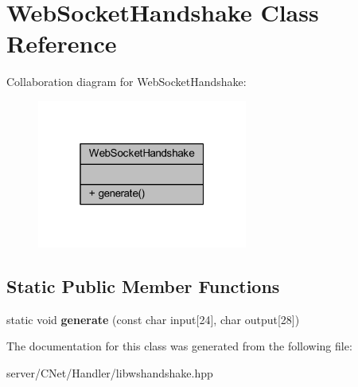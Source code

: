 \hypertarget{class_web_socket_handshake}{}\section{Web\+Socket\+Handshake Class Reference}
\label{class_web_socket_handshake}


Collaboration diagram for Web\+Socket\+Handshake\+:
\nopagebreak
\begin{figure}[H]
\begin{center}
\leavevmode
\includegraphics[width=196pt]{class_web_socket_handshake__coll__graph}
\end{center}
\end{figure}
\subsection*{Static Public Member Functions}
\begin{DoxyCompactItemize}
\item 
\mbox{\label{class_web_socket_handshake_a7e9966dcd8135e90ccba3604d3739280}} 
static void {\bfseries generate} (const char input\mbox{[}24\mbox{]}, char output\mbox{[}28\mbox{]})
\end{DoxyCompactItemize}


The documentation for this class was generated from the following file\+:\begin{DoxyCompactItemize}
\item 
server/\+C\+Net/\+Handler/libwshandshake.\+hpp\end{DoxyCompactItemize}
